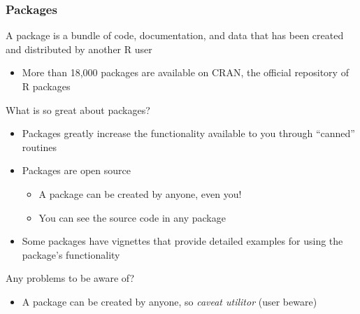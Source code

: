 \documentclass{beamer}\usepackage[]{graphicx}\usepackage[]{xcolor}
\begin{document}
\begin{frame}\frametitle{Packages}
    A package is a bundle of code, documentation, and data that has been created and distributed by another R user
    \begin{itemize}
        \item More than 18,000 packages are available on CRAN, the official repository of R packages 
    \end{itemize}
    \vspace{2ex}
    What is so great about packages?
    \begin{itemize}
        \item Packages greatly increase the functionality available to you through ``canned'' routines
        \item Packages are open source
        \begin{itemize}
            \item A package can be created by anyone, even you!
            \item You can see the source code in any package
        \end{itemize}
        \item Some packages have vignettes that provide detailed examples for using the package's functionality
    \end{itemize}
    \vspace{2ex}
    Any problems to be aware of?
    \begin{itemize}
        \item A package can be created by anyone, so \emph{caveat utilitor} (user beware)
    \end{itemize}
\end{frame}
\end{document}
